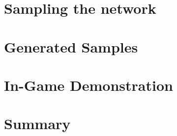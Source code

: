 \section{Sampling the network}
\label{sec:sampling}
\section{Generated Samples}
\section{In-Game Demonstration}
\section{Summary}